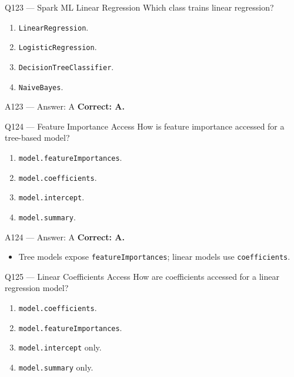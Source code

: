 \documentclass[aspectratio=169,9pt]{beamer}
\begin{document}
	\begin{frame}{Q123 --- Spark ML Linear Regression}
		Which class trains linear regression?
		\begin{enumerate}[label=\Alph*.]
			\item \texttt{LinearRegression}.
			\item \texttt{LogisticRegression}.
			\item \texttt{DecisionTreeClassifier}.
			\item \texttt{NaiveBayes}.
		\end{enumerate}
	\end{frame}
	
	\begin{frame}{A123 --- Answer: A}
		\textbf{Correct: A.}
	\end{frame}
	
	\begin{frame}{Q124 --- Feature Importance Access}
		How is feature importance accessed for a tree-based model?
		\begin{enumerate}[label=\Alph*.]
			\item \texttt{model.featureImportances}.
			\item \texttt{model.coefficients}.
			\item \texttt{model.intercept}.
			\item \texttt{model.summary}.
		\end{enumerate}
	\end{frame}
	
	\begin{frame}{A124 --- Answer: A}
		\textbf{Correct: A.}
		\begin{itemize}
			\item Tree models expose \texttt{featureImportances}; linear models use \texttt{coefficients}.
		\end{itemize}
	\end{frame}
	
	\begin{frame}{Q125 --- Linear Coefficients Access}
		How are coefficients accessed for a linear regression model?
		\begin{enumerate}[label=\Alph*.]
			\item \texttt{model.coefficients}.
			\item \texttt{model.featureImportances}.
			\item \texttt{model.intercept} only.
			\item \texttt{model.summary} only.
		\end{enumerate}
	\end{frame}
	
\end{document}
